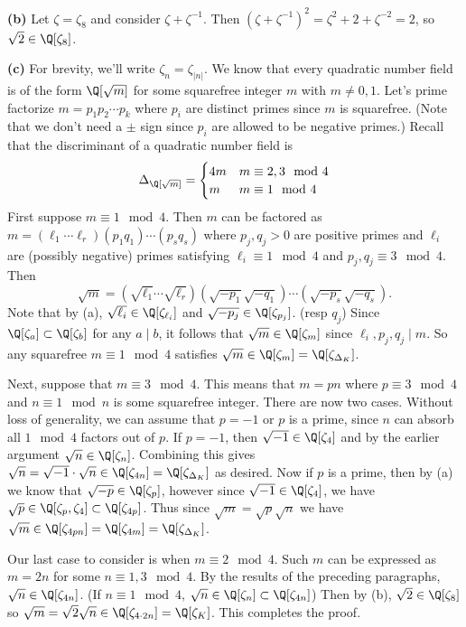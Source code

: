 \documentclass[11pt,letterpaper]{article}
\begin{document}
\begin{solution}
    \textbf{(b)} Let $\zeta=\zeta_8$ and consider $\zeta+\zeta^{-1}$. Then $(\zeta+\zeta^{-1})^2=\zeta^2+2+\zeta^{-2}=2$, so $\sqrt{2}\in \Q[\zeta_8]$.
    
    \textbf{(c)} For brevity, we'll write $\zeta_n=\zeta_{|n|}$. We know that every quadratic number field is of the form $\Q[\sqrt{m}]$ for some squarefree integer $m$ with $m\neq 0,1$. Let's prime factorize $m=p_1p_2\cdots p_k$ where $p_i$ are distinct primes since $m$ is squarefree. (Note that we don't need a $\pm$ sign since $p_i$ are allowed to be negative primes.) Recall that the discriminant of a quadratic number field is
    \[
        \Delta_{\Q[\sqrt{m}]}=\begin{cases}
            4m&m\equiv 2,3\mod 4\\
            m&m\equiv 1\mod 4
        \end{cases}
    \] 
    First suppose $m\equiv 1\mod 4$. Then $m$ can be factored as $m=(\ell_1\cdots \ell_r)(p_1q_1)\cdots (p_sq_s)$ where $p_j, q_j>0$ are positive primes and $\ell_i$ are (possibly negative) primes satisfying $\ell_i\equiv 1\mod 4$ and $p_j, q_j\equiv 3\mod 4$. Then
    \[
        \sqrt{m}=\left(\sqrt{\ell_1}\cdots \sqrt{\ell_r}\right)\left(\sqrt{-p_1}\sqrt{-q_1}\right)\cdots\left(\sqrt{-p_s}\sqrt{-q_s}\right)
    .\] 
    Note that by (a), $\sqrt{\ell_i}\in \Q[\zeta_{\ell_i}]$ and $\sqrt{-p_j}\in \Q[\zeta_{p_j}]$. (resp $q_j$) Since $\Q[\zeta_a]\subset \Q[\zeta_b]$ for any $a\mid b$, it follows that $\sqrt{m}\in \Q[\zeta_{m}]$ since $\ell_i, p_j, q_j \mid m$. So any squarefree $m\equiv 1\mod 4$ satisfies $\sqrt{m}\in \Q[\zeta_{m}]=\Q[\zeta_{\Delta_K}]$. 
    
    Next, suppose that $m\equiv 3\mod 4$. This means that $m=pn$ where $p\equiv 3\mod 4$ and $n\equiv 1\mod n$ is some squarefree integer. There are now two cases. Without loss of generality, we can assume that $p=-1$ or $p$ is a prime, since $n$ can absorb all $1\mod 4$ factors out of $p$. If $p=-1$, then $\sqrt{-1}\in \Q[\zeta_4]$ and by the earlier argument $\sqrt{n}\in \Q[\zeta_n]$. Combining this gives $\sqrt{n}=\sqrt{-1}\cdot\sqrt{n}\in \Q[\zeta_{4n}]=\Q[\zeta_{\Delta_K}]$ as desired. Now if $p$ is a prime, then by (a) we know that $\sqrt{-p}\in \Q[\zeta_p]$, however since $\sqrt{-1}\in \Q[\zeta_4]$, we have $\sqrt{p}\in \Q[\zeta_{p}, \zeta_4]\subset \Q[\zeta_{4p}]$. Thus since $\sqrt{m}=\sqrt{p}\sqrt{n}$ we have $\sqrt{m}\in \Q[\zeta_{4pn}]=\Q[\zeta_{4m}]=\Q[\zeta_{\Delta_K}]$. 

    Our last case to consider is when $m\equiv 2\mod 4$. Such $m$ can be expressed as $m=2n$ for some $n\equiv 1,3\mod 4$. By the results of the preceding paragraphs, $\sqrt{n}\in \Q[\zeta_{4n}]$. (If $n\equiv 1\mod 4$, $\sqrt{n}\in \Q[\zeta_{n}]\subset \Q[\zeta_{4n}]$) Then by (b), $\sqrt{2}\in \Q[\zeta_8]$ so $\sqrt{m}=\sqrt{2}\sqrt{n}\in \Q[\zeta_{4\cdot 2n}]=\Q[\zeta_K]$. This completes the proof.   
\end{solution}
\end{document}
